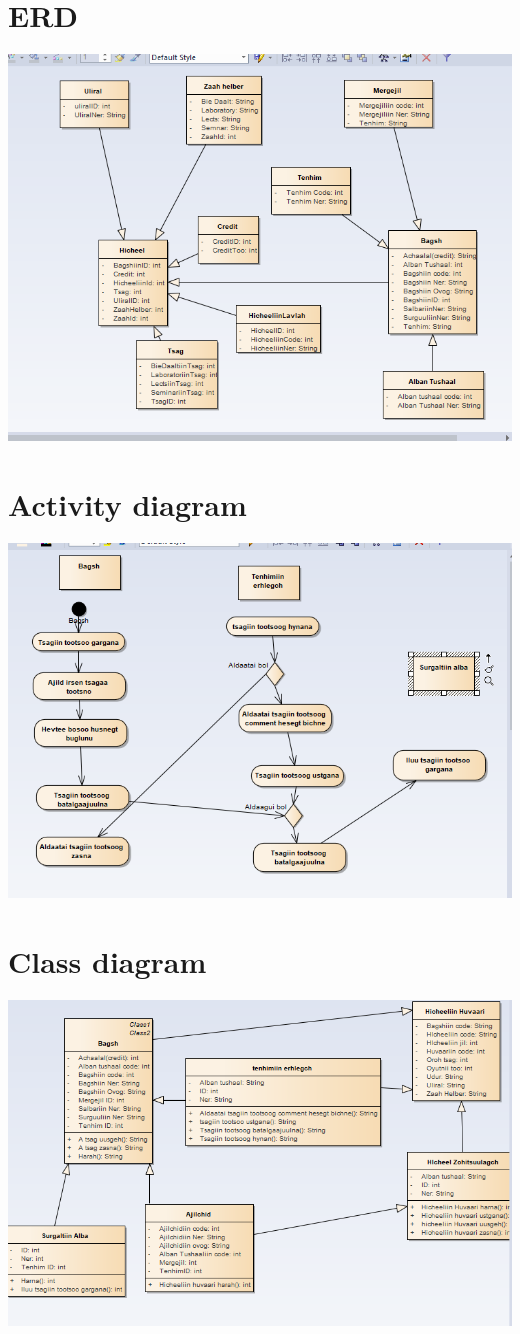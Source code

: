 \documentclass[12pd]{article}
\begin{document}
	\section{ERD}
	\includegraphics[width=\textwidth]{ERD}
	
	\section{Activity diagram}
	\includegraphics[width=\textwidth]{Activity}
	\section{Class diagram}
	\includegraphics[width=\textwidth]{CD}
\end{document}
